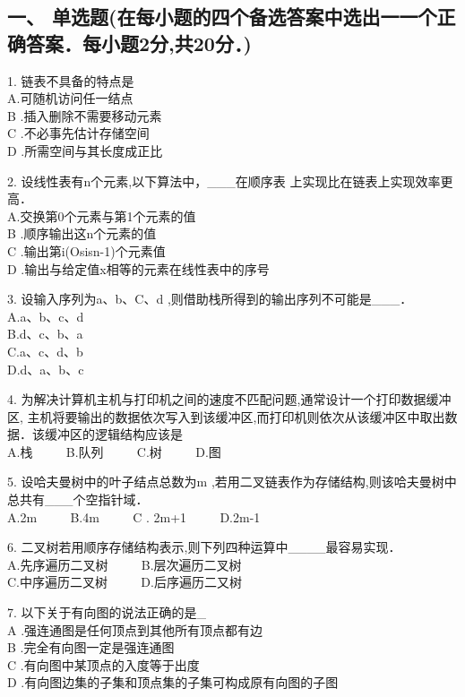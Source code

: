 
\subsection{一、 单选题(在每小题的四个备选答案中选出一一个正确答案．每小题2分,共20分．)}

1. 链表不具备的特点是 \\
A.可随机访问任一结点 \\
B .插入删除不需要移动元素 \\
C .不必事先估计存储空间 \\
D .所需空间与其长度成正比

2. 设线性表有n个元素,以下算法中，___在顺序表 上实现比在链表上实现效率更高． \\
A.交换第0个元素与第1个元素的值 \\
B .顺序输出这n个元素的值 \\
C .输出第i(Osisn-1)个元素值 \\
D .输出与给定值x相等的元素在线性表中的序号

3. 设输入序列为a、b、C、d ,则借助栈所得到的输出序列不可能是___． \\
A.a、b、c、d \\
B.d、c、b、a \\
C.a、c、d、b \\
D.d、a、b、c

4. 为解决计算机主机与打印机之间的速度不匹配问题,通常设计一个打印数据缓冲区, 主机将要输出的数据依次写入到该缓冲区,而打印机则依次从该缓冲区中取出数据．该缓冲区的逻辑结构应该是 \\
A.栈 $\qquad$ B.队列 $\qquad$ C.树 $\qquad$ D.图

5. 设哈夫曼树中的叶子结点总数为m ,若用二叉链表作为存储结构,则该哈夫曼树中总共有___个空指针域． \\
A.2m $\qquad$ B.4m $\qquad$ C . 2m+1 $\qquad$ D.2m-1

6. 二叉树若用顺序存储结构表示,则下列四种运算中____最容易实现． \\
A.先序遍历二叉树 $\qquad$ B.层次遍历二叉树 \\
C.中序遍历二叉树 $\qquad$ D.后序遍历二又树

7. 以下关于有向图的说法正确的是_ \\
A .强连通图是任何顶点到其他所有顶点都有边 \\
B .完全有向图一定是强连通图 \\
C .有向图中某顶点的入度等于出度 \\
D .有向图边集的子集和顶点集的子集可构成原有向图的子图

